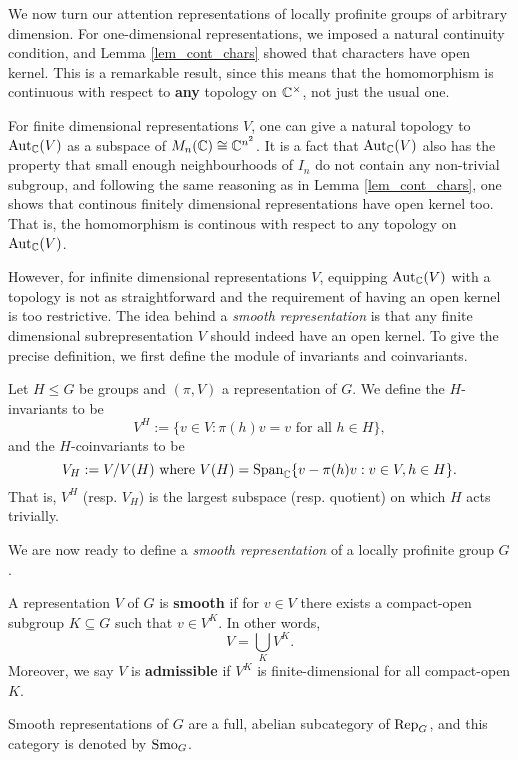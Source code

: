 We now turn our attention representations of locally profinite groups of arbitrary dimension. For one-dimensional representations, we imposed a natural continuity condition, and Lemma \ref{lem_cont_chars} showed that characters have open kernel. This is a remarkable result, since this means that the homomorphism is continuous with respect to \textbf{any} topology on $\mathbb{C}^{\times}$, not just the usual one.

For finite dimensional representations $V$, one can give a natural topology to $\mathrm{Aut}_{\mathbb{C}}(V)$ as a subspace of $M_n(\mathbb{C})\cong\mathbb{C}^{n^2}$. It is a fact that $\mathrm{Aut}_{\mathbb{C}}(V)$ also has the property that small enough neighbourhoods of $I_n$ do not contain any non-trivial subgroup, and following the same reasoning as in Lemma \ref{lem_cont_chars}, one shows that continous finitely dimensional representations have open kernel too. That is, the homomorphism is continous with respect to any topology on $\mathrm{Aut}_{\mathbb{C}}(V)$.

However, for infinite dimensional representations $V$, equipping $\mathrm{Aut}_{\mathbb{C}}(V)$ with a topology is not as straightforward and the requirement of having an open kernel is too restrictive. The idea behind a \textit{smooth representation} is that any finite dimensional subrepresentation $V$ should indeed have an open kernel. To give the precise definition, we first define the module of invariants and coinvariants.

\begin{defn}
    Let $H\leq G$ be groups and $(\pi,V)$ a representation of $G$. We define the $H$-invariants to be 
    $$V^{H}:=\{v\in V:\pi(h)v=v\text{ for all }h\in H\},$$
    and the $H$-coinvariants to be 
    $$V_H:=V/V(H)\text{ where } V(H)=\textrm{Span}_{\mathbb{C}}\{v-\pi(h)v:v\in V,h\in H\}.$$
    That is, $V^H$ (resp. $V_H$) is the largest subspace (resp. quotient) on which $H$ acts trivially.
\end{defn}

We are now ready to define a \textit{smooth representation} of a locally profinite group $G$.

\begin{defn}
	A representation $V$ of $G$ is \textbf{smooth} if for $v\in V$ there exists a compact-open subgroup $K\subseteq G$ such that $v\in V^K$. In other words,
    $$V=\bigcup_K V^K.$$
    Moreover, we say $V$ is \textbf{admissible} if $V^K$ is finite-dimensional for all compact-open $K$.
\end{defn}

Smooth representations of $G$ are a full, abelian subcategory of $\mathrm{Rep}_G$, and this category is denoted by $\mathrm{Smo}_G$. 

